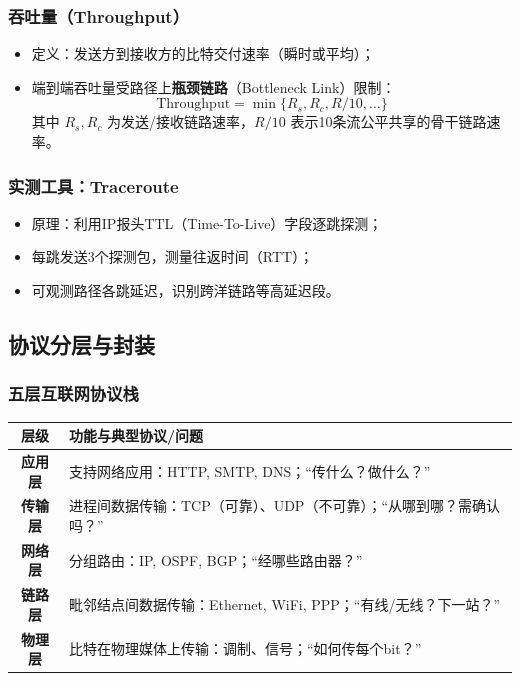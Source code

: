 \subsubsection{吞吐量（Throughput）}

\begin{itemize}
    \item 定义：发送方到接收方的比特交付速率（瞬时或平均）；
    \item 端到端吞吐量受路径上\textbf{瓶颈链路}（Bottleneck Link）限制：
          \[
              \text{Throughput} = \min\{ R_s, R_c, R/10, \dots \}
          \]
          其中 $R_s, R_c$ 为发送/接收链路速率，$R/10$ 表示10条流公平共享的骨干链路速率。
\end{itemize}

\subsubsection{实测工具：Traceroute}

\begin{itemize}
    \item 原理：利用IP报头TTL（Time-To-Live）字段逐跳探测；
    \item 每跳发送3个探测包，测量往返时间（RTT）；
    \item 可观测路径各跳延迟，识别跨洋链路等高延迟段。
\end{itemize}

\subsection{协议分层与封装}

\subsubsection{五层互联网协议栈}

\begin{center}
    \begin{tabular}{c|l}
        层级           & 功能与典型协议/问题                                 \\
        \hline
        \textbf{应用层} & 支持网络应用：HTTP, SMTP, DNS；“传什么？做什么？”          \\
        \textbf{传输层} & 进程间数据传输：TCP（可靠）、UDP（不可靠）；“从哪到哪？需确认吗？”      \\
        \textbf{网络层} & 分组路由：IP, OSPF, BGP；“经哪些路由器？”               \\
        \textbf{链路层} & 毗邻结点间数据传输：Ethernet, WiFi, PPP；“有线/无线？下一站？” \\
        \textbf{物理层} & 比特在物理媒体上传输：调制、信号；“如何传每个bit？”               \\
    \end{tabular}
\end{center}

